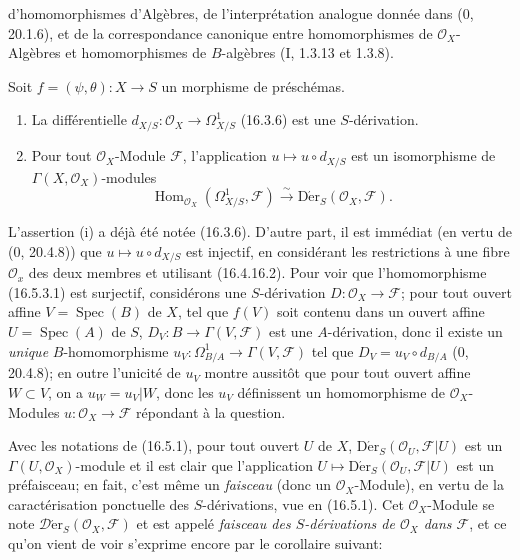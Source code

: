 d'homomorphismes d'Algèbres, de l'interprétation analogue donnée dans
(0, 20.1.6), et de la correspondance canonique entre homomorphismes de
$\mathcal{O}_X$-Algèbres et homomorphismes de $B$-algèbres (I, 1.3.13 et
1.3.8).

\begin{proposition}[16.5.3]
\label{IV.16.5.3}
Soit $f=(\psi,\theta):X\to S$ un morphisme de préschémas.
\begin{enumerate}
\item[(i)] La différentielle
$d_{X/S}:\mathcal{O}_X\to\Omega_{X/S}^1$ (16.3.6) est une $S$-dérivation.
\item[(ii)] Pour tout $\mathcal{O}_X$-Module $\mathscr{F}$, l'application
$u\mapsto u\circ d_{X/S}$ est un isomorphisme de
$\Gamma(X,\mathcal{O}_X)$-modules
\[
  \operatorname{Hom}_{\mathcal{O}_X}(\Omega_{X/S}^1,\mathscr{F})
  \xrightarrow{\sim}
  \operatorname{D\acute{e}r}_S(\mathcal{O}_X,\mathscr{F}).
  \tag{16.5.3.1}
  \label{IV.16.5.3.1}
\]
\end{enumerate}
\end{proposition}

L'assertion (i) a déjà été notée (16.3.6). D'autre part, il est immédiat (en
vertu de (0, 20.4.8)) que $u\mapsto u\circ d_{X/S}$ est injectif, en
considérant les restrictions à une fibre $\mathcal{O}_x$ des deux membres et
utilisant (16.4.16.2). Pour voir que l'homomorphisme (16.5.3.1) est surjectif,
considérons une $S$-dérivation $D:\mathcal{O}_X\to\mathscr{F}$; pour tout
ouvert affine $V=\operatorname{Spec}(B)$ de $X$, tel que $f(V)$ soit contenu
dans un ouvert affine $U=\operatorname{Spec}(A)$ de $S$,
$D_V:B\to\Gamma(V,\mathscr{F})$ est une $A$-dérivation, donc il existe un
\emph{unique} $B$-homomorphisme
$u_V:\Omega_{B/A}^1\to\Gamma(V,\mathscr{F})$ tel que
$D_V=u_V\circ d_{B/A}$ (0, 20.4.8); en outre l'unicité de $u_V$ montre
aussitôt que pour tout ouvert affine $W\subset V$, on a $u_W=u_V|W$, donc les
$u_V$ définissent un homomorphisme de $\mathcal{O}_X$-Modules
$u:\mathcal{O}_X\to\mathscr{F}$ répondant à la question.

\begin{env}[16.5.4]
Avec les notations de (16.5.1), pour tout ouvert $U$ de $X$,
$\operatorname{D\acute{e}r}_S(\mathcal{O}_U,\mathscr{F}|U)$ est un
$\Gamma(U,\mathcal{O}_X)$-module et il est clair que l'application
$U\mapsto\operatorname{D\acute{e}r}_S(\mathcal{O}_U,\mathscr{F}|U)$ est un
préfaisceau; en fait, c'est même un \emph{faisceau} (donc un
$\mathcal{O}_X$-Module), en vertu de la caractérisation ponctuelle des
$S$-dérivations, vue en (16.5.1). Cet $\mathcal{O}_X$-Module se note
$\mathscr{D}\!\mathrm{\acute{e}r}_S(\mathcal{O}_X,\mathscr{F})$ et est appelé
\emph{faisceau des $S$-dérivations de $\mathcal{O}_X$ dans $\mathscr{F}$}, et
ce qu'on vient de voir s'exprime encore par le corollaire suivant:
\end{env}

